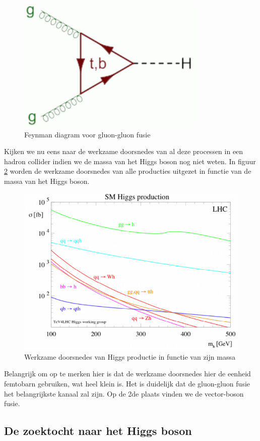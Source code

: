 \documentclass[../main.tex]{subfiles}
\begin{document}
\begin{figure}[h]
    \centering
    \includegraphics[width=0.5\linewidth]{higgs_boson/gluon_gluon_fusie.png}
    \caption{Feynman diagram voor gluon-gluon fusie}%
    \label{fig:higgs_boson/gluon_gluon_fusie}
\end{figure}

Kijken we nu eens naar de werkzame doorsnedes van al deze processen in een hadron collider indien we de massa van het Higgs boson nog niet weten. In figuur \ref{fig:higgs_boson/h_prod_lhc} worden de werkzame doorsnedes van alle producties uitgezet in functie van de massa van het Higgs boson.

\begin{figure}[h]
    \centering
    \includegraphics[width=0.6\linewidth]{higgs_boson/h_prod_lhc.png}
    \caption{Werkzame doorsnedes van Higgs productie in functie van zijn massa}%
    \label{fig:higgs_boson/h_prod_lhc}
\end{figure}

Belangrijk om op te merken hier is dat de werkzame doorsnedes hier de eenheid femtobarn gebruiken, wat heel klein is. Het is duidelijk dat de gluon-gluon fusie het belangrijkste kanaal zal zijn. Op de 2de plaats vinden we de vector-boson fusie.

\subsection{De zoektocht naar het Higgs boson}%
\label{sub:de_zoek_voor_het_higgs_boson}
\end{document}
